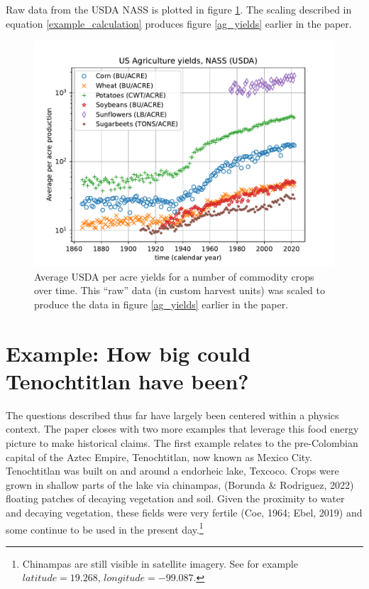\documentclass[man]{apa7}
\begin{document}
Raw data from the USDA NASS is plotted in figure \ref{raw_production_per_acre}.  The scaling described in equation \ref{example_calculation} produces figure \ref{ag_yields} earlier in the paper.
\begin{figure}[ht!]
\centering
\includegraphics[width=\columnwidth]{raw_production_per_acre.pdf}
\caption{
Average USDA per acre yields for a number of commodity crops over time.  This ``raw'' data (in custom harvest units) was scaled to produce the data in figure \ref{ag_yields} earlier in the paper. 
}
\label{raw_production_per_acre}
\end{figure}



\section{Example: How big could Tenochtitlan have been?}
The questions described thus far have largely been centered within a physics context.  The paper closes with two more examples that leverage this food energy picture to make historical claims.  The first example relates to the pre-Colombian capital of the Aztec Empire, Tenochtitlan, now known as Mexico City.  Tenochtitlan was built on and around a endorheic lake, Texcoco.  Crops were grown in shallow parts of the lake via chinampas, (Borunda \& Rodriguez, 2022) floating patches of decaying vegetation and soil.  Given the proximity to water and decaying vegetation, these fields were very fertile (Coe, 1964; Ebel, 2019) and some continue to be used in the present day.\footnote{
Chinampas are still visible in satellite imagery.  See for example $latitude=19.268$, $longitude=-99.087$.
}
\end{document}

